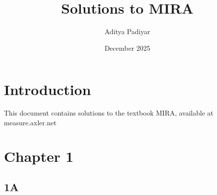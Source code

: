 \documentclass{article}
\title{Solutions to MIRA}
\author{Aditya Padiyar}
\date{December 2025}
\begin{document}
\maketitle

\section*{Introduction}
This document contains solutions to the textbook MIRA, available at \\ measure.axler.net

\section*{Chapter 1}
\subsection*{1A}
\end{document}
